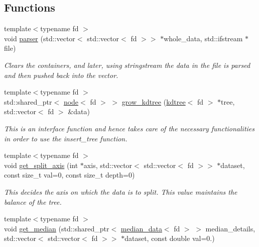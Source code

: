 \subsection*{Functions}
\begin{DoxyCompactItemize}
\item 
{\footnotesize template$<$typename fd $>$ }\\void \hyperlink{namespacekdspace_ae38cb61fa0fc73b8cced4a1bc0fb1d58}{parser} (std\+::vector$<$ std\+::vector$<$ fd $>$$>$ $\ast$whole\+\_\+data, std\+::ifstream $\ast$file)
\begin{DoxyCompactList}\small\item\em Clears the containers, and later, using stringstream the data in the file is parsed and then pushed back into the vector. \end{DoxyCompactList}\item 
{\footnotesize template$<$typename fd $>$ }\\std\+::shared\+\_\+ptr$<$ \hyperlink{classnode}{node}$<$ fd $>$ $>$ \hyperlink{namespacekdspace_a0c2e28665e0ac98030cc9b0d8e017435}{grow\+\_\+kdtree} (\hyperlink{classkdtree}{kdtree}$<$ fd $>$ $\ast$tree, std\+::vector$<$ fd $>$ \&data)
\begin{DoxyCompactList}\small\item\em This is an interface function and hence takes care of the necessary functionalities in order to use the \textquotesingle{}insert\+\_\+tree\textquotesingle{} function. \end{DoxyCompactList}\item 
{\footnotesize template$<$typename fd $>$ }\\void \hyperlink{namespacekdspace_a4b05e61a7246f9455a62996475eb7bf2}{get\+\_\+split\+\_\+axis} (int $\ast$axis, std\+::vector$<$ std\+::vector$<$ fd $>$$>$ $\ast$dataset, const size\+\_\+t val=0, const size\+\_\+t depth=0)
\begin{DoxyCompactList}\small\item\em This decides the axis on which the data is to split. This value maintains the balance of the tree. \end{DoxyCompactList}\item 
{\footnotesize template$<$typename fd $>$ }\\void \hyperlink{namespacekdspace_a4f7e287c43237fb7400437c8ecf955f3}{get\+\_\+median} (std\+::shared\+\_\+ptr$<$ \hyperlink{classkdspace_1_1median__data}{median\+\_\+data}$<$ fd $>$ $>$ median\+\_\+details, std\+::vector$<$ std\+::vector$<$ fd $>$$>$ $\ast$dataset, const double val=0.)
$$
\end{DoxyCompactItemize}
